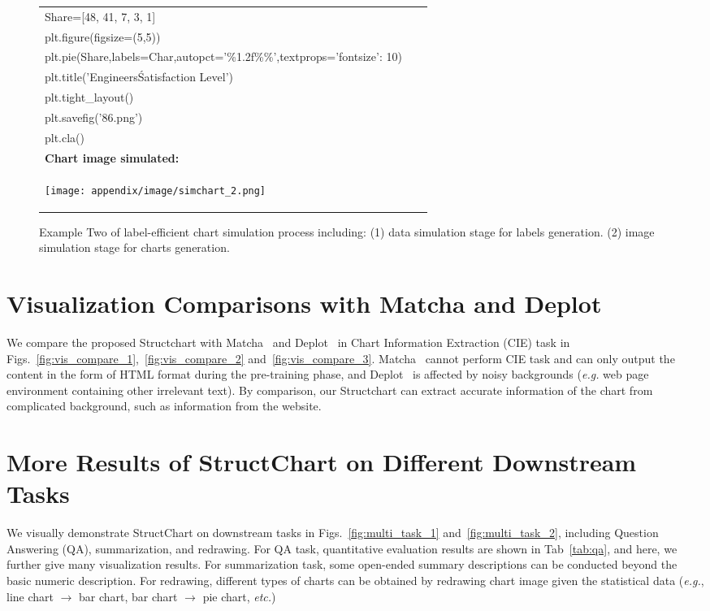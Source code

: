 \documentclass{article} \usepackage{iclr2024_conference,times}
\begin{document}
{\begin{figure}[hp]
{\begin{tabular}{p{0.95\linewidth}}
Share=[48, 41, 7, 3, 1]\\
plt.figure(figsize=(5,5)) \\
plt.pie(Share,labels=Char,autopct='\%1.2f\%\%',textprops={'fontsize': 10})\\ 
plt.title('Engineers\' Satisfaction Level')\\
plt.tight\_layout()\\
plt.savefig('86.png')\\
plt.cla()
\\ \midrule 
\textbf{Chart image simulated:}\\
\begin{center}
    \texttt{[image: appendix/image/simchart\_2.png]}
\end{center}
\\ \bottomrule
    \end{tabular}
   }
    \caption{Example Two of label-efficient chart simulation process including: (1) data simulation stage for labels generation. (2) image simulation stage for charts generation.}
    \label{fig:simulation_2}
\end{figure}


\section{Visualization Comparisons with Matcha and Deplot}
\label{app:compare_matcha}
We compare the proposed Structchart with Matcha~\citep{Liu2022MatChaEV} and Deplot~\citep{Liu2022DePlotOV} in Chart Information Extraction (CIE) task in Figs.~\ref{fig:vis_compare_1},~\ref{fig:vis_compare_2} and~\ref{fig:vis_compare_3}. Matcha~\citep{Liu2022MatChaEV} cannot perform CIE task and can only output the content in the form of HTML format during the pre-training phase, and Deplot~\citep{Liu2022DePlotOV} is affected by noisy backgrounds (\textit{e.g.} web page environment containing other irrelevant text). By comparison, our Structchart can extract accurate information of the chart from complicated background, such as information from the website.

\section{More Results of StructChart on Different Downstream Tasks}
\label{app:different_task}
We visually demonstrate StructChart on downstream tasks in Figs.~\ref{fig:multi_task_1} and~\ref{fig:multi_task_2},  including Question Answering (QA), summarization, and redrawing. For QA task, quantitative evaluation results are shown in Tab~\ref{tab:qa}, and here, we further give many visualization results. For summarization task, some open-ended summary descriptions can be conducted beyond the basic numeric description. For redrawing, different types of charts can be obtained by redrawing chart image given the statistical data (\textit{e.g.}, line chart $\to$ bar chart, bar chart $\to$ pie chart, \textit{etc.})

}
\end{document}
